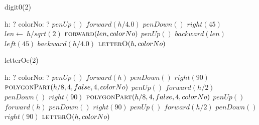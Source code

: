\documentclass[a4paper,10pt]{article}
\begin{document}
\begin{algorithm}
\caption{digit0(2)}
\begin{algorithmic}[5]
\State {}
\State {}
    \State h: ?
    \State colorNo: ?
  \EndDecl
  \State \(penUp()\)
  \State \(forward(h/4.0)\)
  \State \(penDown()\)
  \State \(right(45)\)
  \State \(len\gets\ h/sqrt(2)\)
  \State \(\Call{forward}{len,colorNo}\)
  \State \(penUp()\)
  \State \(backward(len)\)
  \State \(left(45)\)
  \State \(backward(h/4.0)\)
  \State \(\Call{letterO}{h,colorNo}\)
\EndProcedure
\end{algorithmic}
\end{algorithm}


\begin{algorithm}
\caption{letterOe(2)}
\begin{algorithmic}[5]
\State {}
\State {}
    \State h: ?
    \State colorNo: ?
  \EndDecl
  \State \(penUp()\)
  \State \(forward(h)\)
  \State \(penDown()\)
  \State \(right(90)\)
  \State {}
  \State {}
  \State \(\Call{polygonPart}{h/8,4,false,4,colorNo}\)
  \State \(penUp()\)
  \State \(forward(h/2)\)
  \State \(penDown()\)
  \State \(right(90)\)
  \State {}
  \State {}
  \State \(\Call{polygonPart}{h/8,4,false,4,colorNo}\)
  \State \(penUp()\)
  \State \(forward(h)\)
  \State \(penDown()\)
  \State \(right(90)\)
  \State \(penUp()\)
  \State \(forward(h/2)\)
  \State \(penDown()\)
  \State \(right(90)\)
  \State \(\Call{letterO}{h,colorNo}\)
\EndProcedure
\end{algorithmic}
\end{algorithm}
\end{document}
